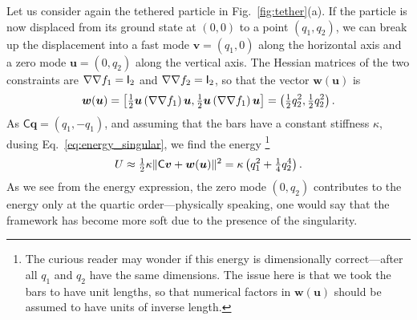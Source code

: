 \begin{example*}
  Let us consider again the tethered particle in Fig.~\ref{fig:tether}(a).
  If the particle is now displaced from its ground state at $(0, 0)$ to a point $(q_{1},q_{2})$, we can break up the displacement into a fast mode $\bm{v} = (q_{1}, 0)$ along the horizontal axis and a zero mode $\bm{u} = (0, q_{2})$ along the vertical axis.
  The Hessian matrices of the two constraints are $\nabla\nabla f_{1} = \mathsf{I}_{2}$ and $\nabla\nabla f_{2} = \mathsf{I}_{2}$, so that the vector $\bm{w}(\bm{u})$ is
  \begin{equation}
      \bm{w}(\bm{u}) = \left[\tfrac{1}{2}\bm{u}\left(\nabla\nabla f_{1}\right)\bm{u}, \tfrac{1}{2}\bm{u}\left(\nabla\nabla f_{1}\right)\bm{u}\right]
                     = \left(\tfrac{1}{2}q_{2}^{2}, \tfrac{1}{2}q_{2}^{2}\right).
  \end{equation}
  As $\mathsf{C}\bm{q} = (q_{1}, -q_{1})$, and assuming that the bars have a constant stiffness $\kappa$, dusing Eq.~\eqref{eq:energy_singular}, we find the energy%
  \footnote{The curious reader may wonder if this energy is dimensionally correct---after all $q_{1}$ and $q_{2}$ have the same dimensions.
  The issue here is that we took the bars to have unit lengths, so that numerical factors in $\bm{w}(\bm{u})$ should be assumed to have units of inverse length.}
  \begin{equation}
    U \approx \tfrac{1}{2}\kappa\lVert\mathsf{C}\bm{v} + \bm{w}(\bm{u})\rVert^{2} = \kappa\left(q_{1}^{2} + \tfrac{1}{4}q_{2}^{4}\right).
  \end{equation}
  As we see from the energy expression, the zero mode $(0, q_{2})$ contributes to the energy only at the quartic order---physically speaking, one would say that the framework has become more soft due to the presence of the singularity.
\end{example*}

